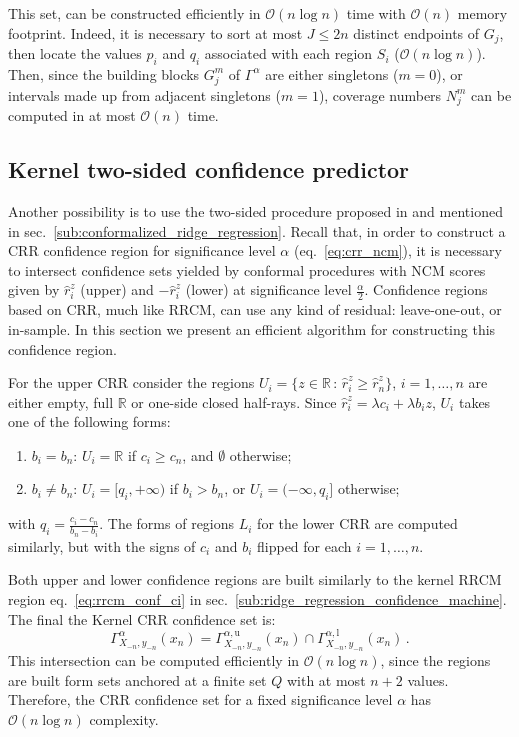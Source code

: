 \documentclass[a4paper,14pt]{extarticle}
\newcommand{\BigO}{\mathcal{O}}
\newcommand{\Real}{\mathbb{R}}
\begin{document}
This set, can be constructed efficiently in $\BigO(n \log{} n)$ time with $\BigO(n)$
memory footprint. Indeed, it is necessary to sort at most $J\leq 2n$ distinct endpoints
of $G_j$, then locate the values $p_i$ and $q_i$ associated with each region $S_i$
($\BigO(n \log{} n)$). Then, since the building blocks $G^m_j$ of $\Gamma^\alpha$
are either singletons ($m=0$), or intervals made up from adjacent singletons ($m=1$),
coverage numbers $N^m_j$ can be computed in at most $\BigO(n)$ time.


\subsection{Kernel two-sided confidence predictor} %
\label{sub:kernel_crr}
Another possibility is to use the two-sided procedure proposed in \cite{burnaevV14}
and mentioned in sec.~\ref{sub:conformalized_ridge_regression}. Recall that, in order
to construct a CRR confidence region for significance level $\alpha$ (eq.~\ref{eq:crr_ncm}),
it is necessary to intersect confidence sets yielded by conformal procedures with NCM
scores given by $\hat{r}_i^z$ (upper) and $-\hat{r}_i^z$ (lower) at significance level
$\frac{\alpha}{2}$. Confidence regions based on CRR, much like RRCM, can use any kind
of residual: leave-one-out, or in-sample. In this section we present an efficient
algorithm for constructing this confidence region.

For the upper CRR consider the regions $U_i = \{z\in\Real\,:\, \hat{r}_i^z \geq \hat{r}_n^z\}$,
$i=1,\ldots, n$ are either empty, full $\Real$ or one-side closed half-rays. Since
$\hat{r}_i^z = \lambda c_i + \lambda b_i z$, $U_i$ takes one of the following forms:
\begin{enumerate}
  \item $b_i=b_n$: $U_i = \Real$ if $c_i\geq c_n$, and $\emptyset$ otherwise;
  \item $b_i\neq b_n$: $U_i = [q_i, +\infty)$ if $b_i>b_n$, or
  $U_i = (-\infty, q_i]$ otherwise;
\end{enumerate}
with $q_i = \frac{c_i-c_n}{b_n-b_i}$. The forms of regions $L_i$ for the lower CRR
are computed similarly, but with the signs of $c_i$ and $b_i$ flipped for each $i=1, \ldots, n$.

Both upper and lower confidence regions are built similarly to the kernel RRCM region
eq.~\ref{eq:rrcm_conf_ci} in sec.~\ref{sub:ridge_regression_confidence_machine}. The
final the Kernel CRR confidence set is:
\begin{equation} \label{eq:crr_conf_ci}
  \Gamma_{X_{-n}, y_{-n}}^\alpha(x_n)
    = \Gamma_{X_{-n}, y_{-n}}^{\alpha,\text{u}}(x_n)
    \cap \Gamma_{X_{-n}, y_{-n}}^{\alpha,\text{l}}(x_n)
    \,.
\end{equation}
This intersection can be computed efficiently in $\BigO(n \log{} n)$, since the regions
are built form sets anchored at a finite set $Q$ with at most $n+2$ values. Therefore,
the CRR confidence set for a fixed significance level $\alpha$ has $\BigO(n\log{} n)$
complexity.
\end{document}
